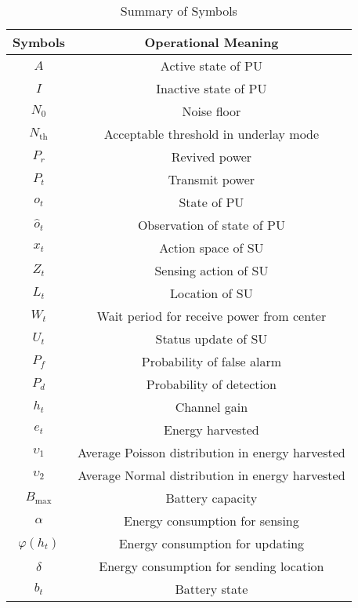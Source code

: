 \documentclass[journal]{IEEEtran}
\begin{document}
		\begin{table}[!t]
			\renewcommand{\arraystretch}{1.3}
			\caption{Summary of Symbols}
			\label{Symbols}
			\centering
			\begin{tabular}{|c|c|}
				\hline
				\bfseries \textbf{Symbols} & \bfseries \textbf{Operational Meaning}\\
				\hline
				$A$ & Active state of PU\\
				\hline
				$I$ & Inactive state of PU\\
				\hline
				$N_{0}$ & Noise floor\\
				\hline
				$N_{\text{th}}$ & Acceptable threshold in underlay mode\\
				\hline
				$P_{r}$ & Revived power\\
				\hline
				$P_{t}$ & Transmit power\\
				\hline
				$o_{t}$ & State of PU\\
				\hline
				$\hat o_{t}$ & Observation of state of PU\\
				\hline
				$x_{t}$ & Action space of SU\\
				\hline
				$Z_{t}$ & Sensing action of SU\\
				\hline
				$L_{t}$ & Location of SU\\
				\hline
				$W_{t}$ & Wait period for receive power from center\\
				\hline
				$U_{t}$ & Status update of SU\\
				\hline
				$P_{f}$ & Probability of false alarm\\
				\hline
				$P_{d}$ & Probability of detection\\
				\hline
				$h_{t}$ & Channel gain\\
				\hline
				$e_{t}$ & Energy harvested\\
				\hline
				${\upsilon _1}$ & Average Poisson distribution in energy harvested\\
				\hline
				${\upsilon _2}$ & Average Normal distribution in energy harvested\\
				\hline
				$B_{\text{max}}$ & Battery capacity\\
				\hline
				$\alpha$ & Energy consumption for sensing\\
				\hline
				$\varphi ({h_t})$ & Energy consumption for updating\\
				\hline
				$\delta$ & Energy consumption for sending location\\
				\hline
				$b_{t}$ & Battery state\\
				\hline

\end{tabular}
\end{table}
\end{document}
